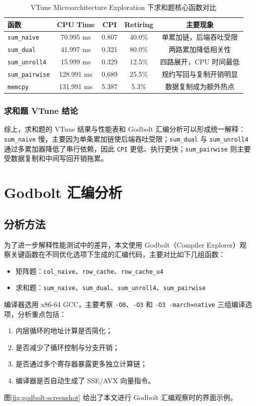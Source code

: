 \documentclass[a4paper]{article}
\begin{document}
\begin{table}[H]
  \centering
  \begin{tabular}{lcccc}
  \toprule
  函数 & CPU Time & CPI & Retiring & 主要现象 \\
  \midrule
  \texttt{sum\_naive} & 70.995 ms & 0.807 & 40.0\% & 单累加链，后端吞吐受限 \\
  \texttt{sum\_dual} & 41.997 ms & 0.321 & 80.0\% & 两路累加降低相关性 \\
  \texttt{sum\_unroll4} & 15.999 ms & 0.329 & 12.5\% & 四路展开，CPU 时间最低 \\
  \texttt{sum\_pairwise} & 128.991 ms & 0.689 & 25.5\% & 规约写回与复制开销明显 \\
  \texttt{memcpy} & 131.991 ms & 5.387 & 5.3\% & 数据复制成为额外热点 \\
  \bottomrule
  \end{tabular}
  \caption{VTune Microarchitecture Exploration 下求和题核心函数对比}
  \label{tab:vtune-sum-micro}
\end{table}

\subsubsection{求和题 VTune 结论}
综上，求和题的 VTune 结果与性能表和 Godbolt 汇编分析可以形成统一解释：\texttt{sum\_naive} 慢，主要因为单条累加链使后端吞吐受限；\texttt{sum\_dual} 与 \texttt{sum\_unroll4} 通过多累加器降低了串行依赖，因此 \texttt{CPI} 更低、执行更快；\texttt{sum\_pairwise} 则主要受数据复制和中间写回开销拖累。

\section{Godbolt 汇编分析}
\subsection{分析方法}
为了进一步解释性能测试中的差异，本文使用 Godbolt（Compiler Explorer）观察关键函数在不同优化选项下生成的汇编代码，主要对比如下几组函数：
\begin{itemize}
  \item 矩阵题：\texttt{col\_naive}、\texttt{row\_cache}、\texttt{row\_cache\_u4}
  \item 求和题：\texttt{sum\_naive}、\texttt{sum\_dual}、\texttt{sum\_unroll4}、\texttt{sum\_pairwise}
\end{itemize}
编译器选用 x86-64 GCC，主要考察 \texttt{-O0}、\texttt{-O3} 和 \texttt{-O3 -march=native} 三组编译选项，分析重点包括：
\begin{enumerate}
  \item 内层循环的地址计算是否简化；
  \item 是否减少了循环控制与分支开销；
  \item 是否通过多个寄存器暴露更多独立计算链；
  \item 编译器是否自动生成了 SSE/AVX 向量指令。
\end{enumerate}
图\ref{fig:godbolt-screenshot} 给出了本文进行 Godbolt 汇编观察时的界面示例。
\end{document}
